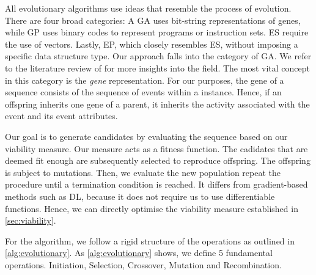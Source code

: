 \documentclass[./../../paper.tex]{subfiles}
\begin{document}





All evolutionary algorithms use ideas that resemble the process of evolution. There are four broad categories: A \gls{GA} uses bit-string representations of genes, while \gls{GP} uses binary codes to represent programs or instruction sets. \gls{ES} require the use of vectors. Lastly, \gls{EP}, which closely resembles \gls{ES}, without imposing a specific data structure type\autocites{lambora_GeneticAlgorithmLiterature_2019,vikhar_Evolutionaryalgorithmscritical_2016}. Our approach falls into the category of \gls{GA}. We refer to the literature review of \citeauthor{vikhar_Evolutionaryalgorithmscritical_2016} for more insights into the field. The most vital concept in this category is the \emph{gene} representation. For our purposes, the gene of a sequence consists of the sequence of events within a \gls{instance}. Hence, if an offspring inherits one gene of a parent, it inherits the activity associated with the event and its event attributes. 

Our goal is to generate candidates by evaluating the sequence based on our viability measure. Our measure acts as a fitness function. The cadidates that are deemed fit enough are subsequently selected to reproduce offspring. The offspring is subject to mutations. Then, we evaluate the new population repeat the procedure until a termination condition is reached. It differs from gradient-based methods such as \gls{DL}, because it does not require us to use differentiable functions. Hence, we can directly optimise the viability measure established in \autoref{sec:viability}.

For the algorithm, we follow a rigid structure of the operations as outlined in \autoref{alg:evolutionary}. As \autoref{alg:evolutionary} shows, we define 5 fundamental operations. Initiation, Selection, Crossover, Mutation and Recombination.
\end{document}
